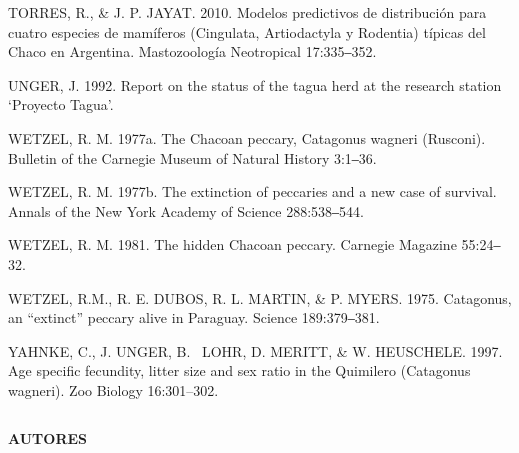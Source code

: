 \documentclass[
  x11names]{article}
\begin{document}
TORRES, R., \& J. P. JAYAT. 2010. Modelos predictivos de distribución
para cuatro especies de mamíferos (Cingulata, Artiodactyla y Rodentia)
típicas del Chaco en Argentina. Mastozoología Neotropical 17:335‒352.

UNGER, J. 1992. Report on the status of the tagua herd at the research
station `Proyecto Tagua'.

WETZEL, R. M. 1977a. The Chacoan peccary, Catagonus wagneri (Rusconi).
Bulletin of the Carnegie Museum of Natural History 3:1‒36.

WETZEL, R. M. 1977b. The extinction of peccaries and a new case of
survival. Annals of the New York Academy of Science 288:538‒544.

WETZEL, R. M. 1981. The hidden Chacoan peccary. Carnegie Magazine
55:24‒32.

WETZEL, R.M., R. E. DUBOS, R. L. MARTIN, \& P. MYERS. 1975. Catagonus,
an ``extinct'' peccary alive in Paraguay. Science 189:379‒381.

YAHNKE, C., J. UNGER, B.~ LOHR, D. MERITT, \& W. HEUSCHELE. 1997. Age
specific fecundity, litter size and sex ratio in the Quimilero
(Catagonus wagneri). Zoo Biology 16:301--302.

\setlength{\parindent}{0pt}

%
\begin{table}[H]
\centering
\begin{tabular}[t]{>{\raggedright\arraybackslash}m{16cm}>{}m{16cm}}
\toprule
\cellcolor{ceil}{\textcolor{white}{\textbf{\rule{0pt}{14pt}AUTORES Y COLABOLADORES}}}\\
\bottomrule
\end{tabular}
\end{table}

\vspace{-0.4cm}

\textbf{AUTORES}

\end{document}
